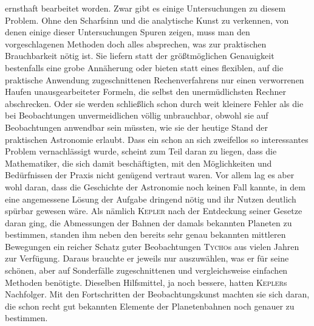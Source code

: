 ernsthaft bearbeitet worden. Zwar gibt es einige Untersuchungen zu diesem Problem. Ohne den Scharfsinn und die analytische Kunst zu verkennen, von denen einige dieser Untersuchungen Spuren zeigen, muss man den vorgeschlagenen Methoden doch alles absprechen, was zur praktischen Brauchbarkeit nötig ist. Sie liefern statt der größtmöglichen Genauigkeit bestenfalls eine grobe Annäherung oder bieten statt eines flexiblen, auf die praktische Anwendung zugeschnittenen Rechenverfahrens nur einen verworrenen Haufen unausgearbeiteter Formeln, die selbst den unermüdlichsten Rechner abschrecken. Oder sie werden schließlich schon durch weit kleinere Fehler als die bei Beobachtungen unvermeidlichen völlig unbrauchbar, obwohl sie auf Beobachtungen anwendbar sein müssten, wie sie der heutige Stand der praktischen Astronomie erlaubt. Dass ein schon an sich zweifellos so interessantes Problem vernachlässigt wurde, scheint zum Teil daran zu liegen, dass die Mathematiker, die sich damit beschäftigten, mit den Möglichkeiten und Bedürfnissen der Praxis nicht genügend vertraut waren. Vor allem lag es aber wohl daran, dass die Geschichte der Astronomie noch keinen Fall kannte, in dem eine angemessene Lösung der Aufgabe dringend nötig und ihr Nutzen deutlich spürbar gewesen wäre. Als nämlich \textsc{Kepler} nach der Entdeckung seiner Gesetze daran ging, die Abmessungen der Bahnen der damals bekannten Planeten zu bestimmen, standen ihm neben den bereits sehr genau bekannten mittleren Bewegungen ein reicher Schatz guter Beobachtungen \textsc{Tycho}s aus vielen Jahren zur Verfügung. Daraus brauchte er jeweils nur auszuwählen, was er für seine schönen, aber auf Sonderfälle zugeschnittenen und vergleichsweise einfachen Methoden benötigte. Dieselben Hilfsmittel, ja noch bessere, hatten \textsc{Kepler}s Nachfolger. Mit den Fortschritten der Beobachtungskunst machten sie sich daran, die schon recht gut bekannten Elemente der Planetenbahnen noch genauer zu bestimmen.


